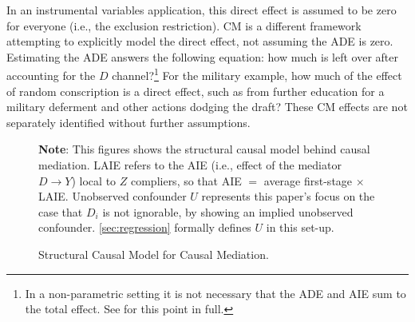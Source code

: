 In an instrumental variables application, this direct effect is assumed to be zero for everyone (i.e., the exclusion restriction).
CM is a different framework attempting to explicitly model the direct effect, not assuming the ADE is zero.
Estimating the ADE answers the following equation: how much is left over after accounting for the $D$ channel?\footnote{
    In a non-parametric setting it is not necessary that the ADE and AIE sum to the total effect.
    See \cite{imai2010identification} for this point in full.
}
For the military example, how much of the effect of random conscription is a direct effect, such as from further education for a military deferment and other actions dodging the draft?
These CM effects are not separately identified without further assumptions.

\begin{figure}[h!]
    \centering
    \singlespacing
    \caption{Structural Causal Model for Causal Mediation.}
    \label{fig:scm-model}
    \justify
    \footnotesize
    \textbf{Note}:
    This figures shows the structural causal model behind causal mediation.
    LAIE refers to the AIE (i.e., effect of the mediator $D \to Y$) local to $Z$ compliers, so that AIE $=$ average first-stage $\times$ LAIE.
    Unobserved confounder $U$ represents this paper's focus on the case that $D_i$ is not ignorable, by showing an implied unobserved confounder.
    \autoref{sec:regression} formally defines $U$ in this set-up.
\end{figure}

